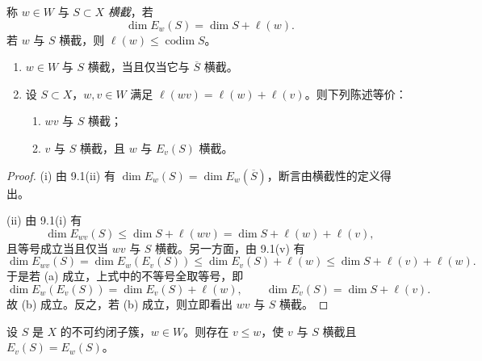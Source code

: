 称 $w\in W$ 与 $S\subset X$ \emph{横截}，若
$$\dim E_w(S)=\dim S+\ell(w).$$
若 $w$ 与 $S$ 横截，则 $\ell(w)\le\operatorname{codim} S$。

\begin{lemma}\label{lem:03.9.2}
\begin{enumerate}[label=(\roman*),leftmargin=2.6em,itemsep=0.1em]
\item $w\in W$ 与 $S$ 横截，当且仅当它与 $\overline S$ 横截。
\item 设 $S\subset X$，$w,v\in W$ 满足 $\ell(wv)=\ell(w)+\ell(v)$。则下列陈述等价：
\begin{enumerate}[label=(\alph*)]
\item $wv$ 与 $S$ 横截；
\item $v$ 与 $S$ 横截，且 $w$ 与 $E_v(S)$ 横截。
\end{enumerate}
\end{enumerate}
\end{lemma}

\begin{proof}
(i) 由 9.1(ii) 有 $\dim E_w(S)=\dim E_w(\overline S)$，断言由横截性的定义得出。

(ii) 由 9.1(i) 有
$$\dim E_{wv}(S)\le\dim S+\ell(wv)=\dim S+\ell(w)+\ell(v),$$
且等号成立当且仅当 $wv$ 与 $S$ 横截。另一方面，由 9.1(v) 有
$$\dim E_{wv}(S)=\dim E_w(E_v(S))\le\dim E_v(S)+\ell(w)\le\dim S+\ell(v)+\ell(w).$$
于是若 (a) 成立，上式中的不等号全取等号，即
$$\dim E_w(E_v(S))=\dim E_v(S)+\ell(w),\qquad \dim E_v(S)=\dim S+\ell(v).$$
故 (b) 成立。反之，若 (b) 成立，则立即看出 $wv$ 与 $S$ 横截。
\end{proof}

\begin{lemma}\label{lem:03.9.3}
设 $S$ 是 $X$ 的不可约闭子簇，$w\in W$。则存在 $v\le w$，使 $v$ 与 $S$ 横截且 $E_v(S)=E_w(S)$。
\end{lemma}

